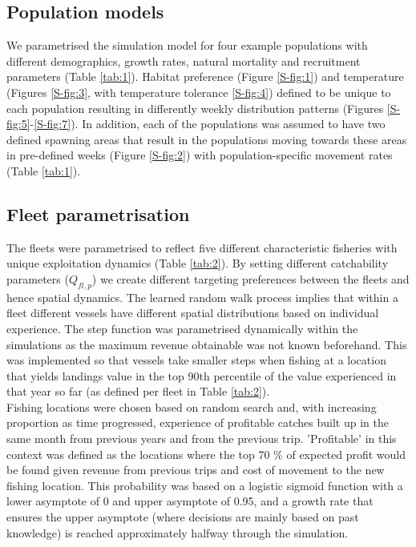 \documentclass[review]{elsarticle}
\begin{document}
\subsection{Population models}

We parametrised the simulation model for four example populations with
different demographics, growth rates, natural mortality and recruitment
parameters (Table \ref{tab:1}). Habitat preference (Figure \ref{S-fig:1}) and
temperature (Figures \ref{S-fig:3}, with temperature tolerance \ref{S-fig:4})
defined to be unique to each population resulting in differently weekly
distribution patterns (Figures \ref{S-fig:5}-\ref{S-fig:7}). In addition, each
of the populations was assumed to have two defined spawning areas that result
in the populations moving towards these areas in pre-defined weeks (Figure
\ref{S-fig:2}) with population-specific movement rates (Table \ref{tab:1}).

\subsection{Fleet parametrisation}

The fleets were parametrised to reflect five different characteristic fisheries
with unique exploitation dynamics (Table \ref{tab:2}). By setting different
catchability parameters ($Q_{fl, p}$) we create different targeting preferences
between the fleets and hence spatial dynamics.  The learned random walk process
implies that within a fleet different vessels have different spatial
distributions based on individual experience. The step function was
parametrised dynamically within the simulations as the maximum revenue
obtainable was not known beforehand. This was implemented so that vessels take
smaller steps when fishing at a location that yields landings value in the top
90th percentile of the value experienced in that year so far (as defined per
fleet in Table \ref{tab:2}). \\

Fishing locations were chosen based on random search and, with increasing
proportion as time progressed, experience of profitable catches built up in the
same month from previous years and from the previous trip.  'Profitable' in
this context was defined as the locations where the top 70 \% of expected
profit would be found given revenue from previous trips and cost of movement to
the new fishing location. This probability was based on a logistic sigmoid
function with a lower asymptote of 0 and upper asymptote of 0.95, and a growth
rate that ensures the upper asymptote (where decisions are mainly based on past
knowledge) is reached approximately halfway through the simulation.  \\
\end{document}
